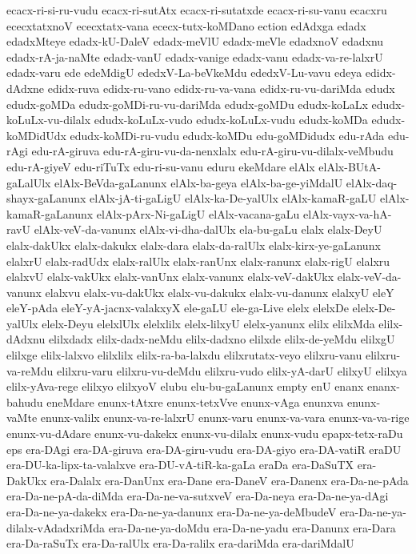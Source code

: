 {ecacx-ri-si-ru-vudu
ecacx-ri-sutAtx
ecacx-ri-sutatxde
ecacx-ri-su-vanu
ecacxru
ececxtatxnoV
ececxtatx-vana
ececx-tutx-koMDano
ection
edAdxga
edadx
edadxMteye
edadx-kU-DaleV
edadx-meVlU
edadx-meVle
edadxnoV
edadxnu
edadx-rA-ja-naMte
edadx-vanU
edadx-vanige
edadx-vanu
edadx-va-re-lalxrU
edadx-varu
ede
edeMdigU
ededxV-La-beVkeMdu
ededxV-Lu-vavu
edeya
edidx-dAdxne
edidx-ruva
edidx-ru-vano
edidx-ru-va-vana
edidx-ru-vu-dariMda
edudx
edudx-goMDa
edudx-goMDi-ru-vu-dariMda
edudx-goMDu
edudx-koLaLx
edudx-koLuLx-vu-dilalx
edudx-koLuLx-vudo
edudx-koLuLx-vudu
edudx-koMDa
edudx-koMDidUdx
edudx-koMDi-ru-vudu
edudx-koMDu
edu-goMDidudx
edu-rAda
edu-rAgi
edu-rA-giruva
edu-rA-giru-vu-da-nenxlalx
edu-rA-giru-vu-dilalx-veMbudu
edu-rA-giyeV
edu-riTuTx
edu-ri-su-vanu
eduru
ekeMdare
elAlx
elAlx-BUtA-gaLalUlx
elAlx-BeVda-gaLanunx
elAlx-ba-geya
elAlx-ba-ge-yiMdalU
elAlx-daq-shayx-gaLanunx
elAlx-jA-ti-gaLigU
elAlx-ka-De-yalUlx
elAlx-kamaR-gaLU
elAlx-kamaR-gaLanunx
elAlx-pArx-Ni-gaLigU
elAlx-vacana-gaLu
elAlx-vayx-va-hA-ravU
elAlx-veV-da-vanunx
elAlx-vi-dha-dalUlx
ela-bu-gaLu
elalx
elalx-DeyU
elalx-dakUkx
elalx-dakukx
elalx-dara
elalx-da-ralUlx
elalx-kirx-ye-gaLanunx
elalxrU
elalx-radUdx
elalx-ralUlx
elalx-ranUnx
elalx-ranunx
elalx-rigU
elalxru
elalxvU
elalx-vakUkx
elalx-vanUnx
elalx-vanunx
elalx-veV-dakUkx
elalx-veV-da-vanunx
elalxvu
elalx-vu-dakUkx
elalx-vu-dakukx
elalx-vu-danunx
elalxyU
eleY
eleY-pAda
eleY-yA-jacnx-valakxyX
ele-gaLU
ele-ga-Live
elelx
elelxDe
elelx-De-yalUlx
elelx-Deyu
elelxlUlx
elelxlilx
elelx-lilxyU
elelx-yanunx
elilx
elilxMda
elilx-dAdxnu
elilxdadx
elilx-dadx-neMdu
elilx-dadxno
elilxde
elilx-de-yeMdu
elilxgU
elilxge
elilx-lalxvo
elilxlilx
elilx-ra-ba-lalxdu
elilxrutatx-veyo
elilxru-vanu
elilxru-va-reMdu
elilxru-varu
elilxru-vu-deMdu
elilxru-vudo
elilx-yA-darU
elilxyU
elilxya
elilx-yAva-rege
elilxyo
elilxyoV
elubu
elu-bu-gaLanunx
empty
enU
enanx
enanx-bahudu
eneMdare
enunx-tAtxre
enunx-tetxVve
enunx-vAga
enunxva
enunx-vaMte
enunx-valilx
enunx-va-re-lalxrU
enunx-varu
enunx-va-vara
enunx-va-va-rige
enunx-vu-dAdare
enunx-vu-dakekx
enunx-vu-dilalx
enunx-vudu
epapx-tetx-raDu
eps
era-DAgi
era-DA-giruva
era-DA-giru-vudu
era-DA-giyo
era-DA-vatiR
eraDU
era-DU-ka-lipx-ta-valalxve
era-DU-vA-tiR-ka-gaLa
eraDa
era-DaSuTX
era-DakUkx
era-Dalalx
era-DanUnx
era-Dane
era-DaneV
era-Danenx
era-Da-ne-pAda
era-Da-ne-pA-da-diMda
era-Da-ne-va-sutxveV
era-Da-neya
era-Da-ne-ya-dAgi
era-Da-ne-ya-dakekx
era-Da-ne-ya-danunx
era-Da-ne-ya-deMbudeV
era-Da-ne-ya-dilalx-vAdadxriMda
era-Da-ne-ya-doMdu
era-Da-ne-yadu
era-Danunx
era-Dara
era-Da-raSuTx
era-Da-ralUlx
era-Da-ralilx
era-dariMda
era-dariMdalU
}
